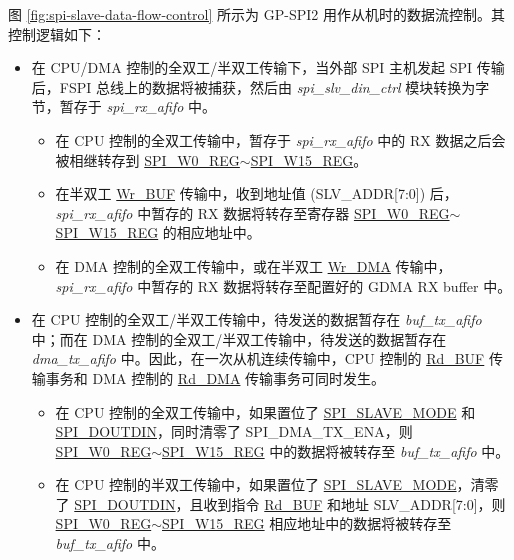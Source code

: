 \documentclass[main\_\_CN.tex]{subfiles}
\begin{document}
图 \ref{fig:spi-slave-data-flow-control} 所示为 GP-SPI2 用作从机时的数据流控制。其控制逻辑如下：
\begin{itemize}
    \item 在 CPU/DMA 控制的全双工/半双工传输下，当外部 SPI 主机发起 SPI 传输后，FSPI 总线上的数据将被捕获，然后由 \emph{spi\_slv\_din\_ctrl} 模块转换为字节，暂存于 \emph{spi\_rx\_afifo} 中。
    \begin{itemize}
        \item 在 CPU 控制的全双工传输中，暂存于 \emph{spi\_rx\_afifo} 中的 RX 数据之后会被相继转存到 \hyperref[regdesc:SPIW0REG]{SPI\_W0\_REG}$\sim$\hyperref[regdesc:SPIW15REG]{SPI\_W15\_REG}。
        
        \item 在半双工 \hyperref[cmd:wrbuf]{Wr\_BUF} 传输中，收到地址值 (SLV\_ADDR[7:0]) 后，\emph{spi\_rx\_afifo} 中暂存的 RX 数据将转存至寄存器 \hyperref[regdesc:SPIW0REG]{SPI\_W0\_REG}$\sim$\hyperref[regdesc:SPIW15REG]{SPI\_W15\_REG} 的相应地址中。
       
        \item 在 DMA 控制的全双工传输中，或在半双工 \hyperref[cmd:wrdma]{Wr\_DMA} 传输中，\emph{spi\_rx\_afifo} 中暂存的 RX 数据将转存至配置好的 GDMA RX buffer 中。
        
    \end{itemize}

    \item 在 CPU 控制的全双工/半双工传输中，待发送的数据暂存在 \emph{buf\_tx\_afifo} 中；而在 DMA 控制的全双工/半双工传输中，待发送的数据暂存在 \emph{dma\_tx\_afifo} 中。因此，在一次从机连续传输中，CPU 控制的 \hyperref[cmd:rdbuf]{Rd\_BUF} 传输事务和 DMA 控制的 \hyperref[cmd:rddma]{Rd\_DMA} 传输事务可同时发生。
    \begin{itemize}
        \item 在 CPU 控制的全双工传输中，如果置位了 \hyperref[fielddesc:SPISLAVEMODE]{SPI\_SLAVE\_MODE} 和 \hyperref[fielddesc:SPIDOUTDIN]{SPI\_DOUTDIN}，同时清零了 SPI\_DMA\_TX\_ENA，则 \hyperref[regdesc:SPIW0REG]{SPI\_W0\_REG}$\sim$\hyperref[regdesc:SPIW15REG]{SPI\_W15\_REG} 中的数据将被转存至 \emph{buf\_tx\_afifo} 中。
        
        \item 在 CPU 控制的半双工传输中，如果置位了 \hyperref[fielddesc:SPISLAVEMODE]{SPI\_SLAVE\_MODE}，清零了 \hyperref[fielddesc:SPIDOUTDIN]{SPI\_DOUTDIN}，且收到指令 \hyperref[cmd:rdbuf]{Rd\_BUF} 和地址 SLV\_ADDR[7:0]，则 \hyperref[regdesc:SPIW0REG]{SPI\_W0\_REG}$\sim$\hyperref[regdesc:SPIW15REG]{SPI\_W15\_REG} 相应地址中的数据将被转存至 \emph{buf\_tx\_afifo} 中。        
       

\end{itemize}
\end{itemize}
\end{document}
